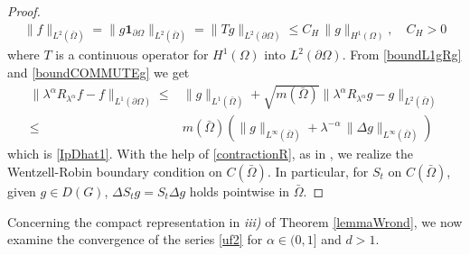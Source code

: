 \documentclass[11pt,a4paper]{article}
\begin{document}
\begin{proof}
\begin{align*}
\| f \|_{L^2(\bar{\Omega})} = \| g \mathbf{1}_{\partial \Omega} \|_{L^2(\bar{\Omega})} = \| Tg \|_{L^2(\partial \Omega)} \leq C_H\, \| g \|_{H^1(\Omega)}, \quad C_H>0
\end{align*}
where $T$ is a continuous operator for $H^1(\Omega)$ into $L^2(\partial \Omega)$. From \eqref{boundL1gRg} and \eqref{boundCOMMUTEg} we get
\begin{align*}
\| \lambda^\alpha R_{\lambda^\alpha} f - f \|_{L^1(\partial \Omega)} 
\leq & \| g\|_{L^1(\bar{\Omega})} + \sqrt{m(\bar{\Omega})} \|\lambda^\alpha R_{\lambda^\alpha} g - g\|_{L^2(\bar{\Omega})}\\ 
\leq & m(\bar{\Omega}) \left( \| g\|_{L^\infty(\bar{\Omega})} + \lambda^{-\alpha}\,  \| \Delta g \|_{L^\infty (\bar{\Omega})} \right)
\end{align*}
which is \eqref{IpDhat1}. With the help of \eqref{contractionR}, as in \cite{ArendtSauter2022}, we realize the Wentzell-Robin boundary condition  on $C(\bar{\Omega})$. In particular, for $S_t$ on $C(\bar{\Omega})$, given $g \in D(G)$, $\Delta S_t g = S_t \Delta g$ holds pointwise in $\bar{\Omega}$. 
\end{proof}



Concerning the compact representation in \textit{iii)} of Theorem \ref{lemmaWrond}, we now examine the convergence of the series \eqref{uf2} for $\alpha \in (0,1]$ and $d>1$.\\
\end{document}
